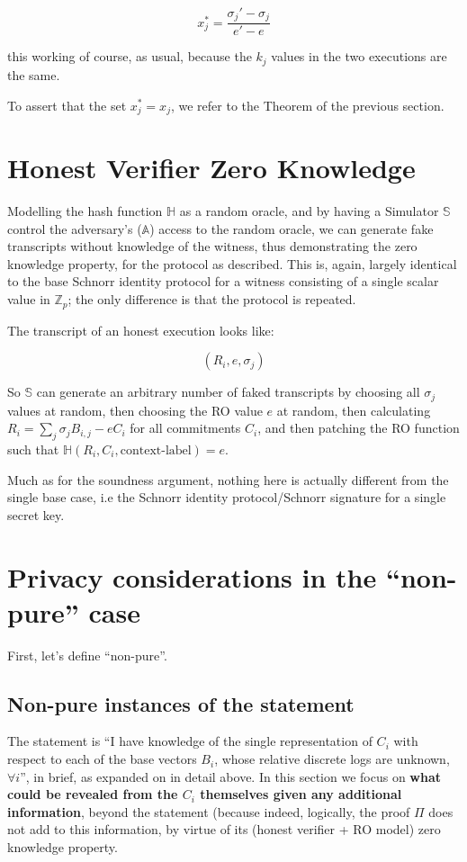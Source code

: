 \documentclass[10pt,a4paper]{article}
\begin{document}
$$x_{j}^* = \frac{\sigma_{j}' - \sigma_j}{e' - e}$$

this working of course, as usual, because the $k_j$ values in the two executions are the same.

To assert that the set ${x_{j}^*} = {x_{j}}$, we refer to the Theorem of the previous section.


\section{Honest Verifier Zero Knowledge}

Modelling the hash function $\mathbb{H}$ as a random oracle, and by having a Simulator $\mathbb{S}$ control the adversary's ($\mathbb{A}$) access to the random oracle, we can generate fake transcripts without knowledge of the witness, thus demonstrating the zero knowledge property, for the protocol as described. This is, again, largely identical to the base Schnorr identity protocol for a witness consisting of a single scalar value in $\mathbb{Z}_p$; the only difference is that the protocol is repeated.

\vspace{5 pt}

The transcript of an honest execution looks like:

$$(R_i, e, \sigma_j)$$

So $\mathbb{S}$ can generate an arbitrary number of faked transcripts by choosing all $\sigma_j$ values at random, then choosing the RO value $e$ at random, then calculating $R_i = \sum_j \sigma_j B_{i,j} - eC_i$ for all commitments $C_i$, and then patching the RO function such that $\mathbb{H}(R_i, C_i, \textrm{context-label}) = e$.

Much as for the soundness argument, nothing here is actually different from the single base case, i.e the Schnorr identity protocol/Schnorr signature for a single secret key.

\section{Privacy considerations in the ``non-pure'' case}

First, let's define ``non-pure''.

\subsection{Non-pure instances of the statement}

The statement is ``I have knowledge of the single representation of $C_i$ with respect to each of the base vectors $B_i$, whose relative discrete logs are unknown, $\forall i$'', in brief, as expanded on in detail above. In this section we focus on \textbf{what could be revealed from the $C_i$ themselves given any additional information}, beyond the statement (because indeed, logically, the proof $\Pi$ does not add to this information, by virtue of its (honest verifier + RO model) zero knowledge property.
\end{document}
